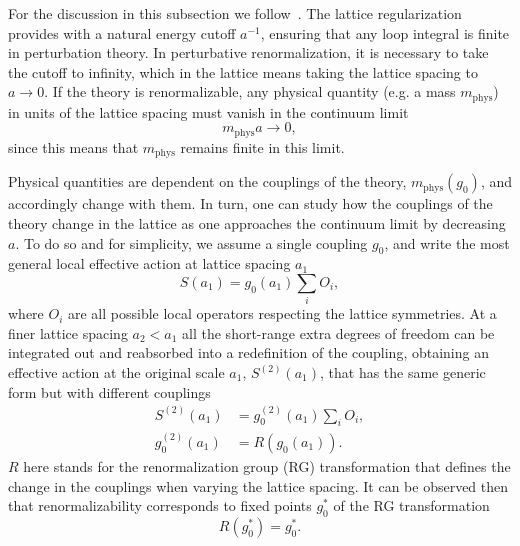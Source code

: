 For the discussion in this subsection we follow~\citep{Hernandez:2009zz}. The lattice regularization provides with a natural energy cutoff $a^{-1}$, ensuring that any loop integral is finite in perturbation theory. In perturbative renormalization, it is necessary to take the cutoff to infinity, which in the lattice means taking the lattice spacing to $a\rightarrow0$. If the theory is renormalizable, any physical quantity (e.g. a mass $m_{\textrm{phys}}$) in units of the lattice spacing must vanish in the continuum limit
\begin{equation}
\label{ch_foundation:eq:ma0}
m_{\textrm{phys}}a\rightarrow0,
\end{equation}
since this means that $m_{\textrm{phys}}$ remains finite in this limit. 

Physical quantities are dependent on the couplings of the theory, $m_{\textrm{phys}}(g_0)$, and accordingly change with them. In turn, one can study how the couplings of the theory change in the lattice as one approaches the continuum limit by decreasing $a$. To do so and for simplicity, we assume a single coupling $g_0$, and write the most general local effective action at lattice spacing $a_1$
\begin{equation}
S(a_1)=g_0(a_1)\sum_i{O}_i,
\end{equation}
where ${O}_i$ are all possible local operators respecting the lattice symmetries. At a finer lattice spacing $a_2<a_1$ all the short-range extra degrees of freedom can be integrated out and reabsorbed into a redefinition of the coupling, obtaining an effective action at the original scale $a_1$, $S^{(2)}(a_1)$, that has the same generic form but with different couplings
\begin{align}
S^{(2)}(a_1)&=g_0^{(2)}(a_1)\sum_iO_i, \\
g_0^{(2)}(a_1)&=R(g_0(a_1)).
\end{align}
$R$ here stands for the renormalization group (RG) transformation that defines the change in the couplings when varying the lattice spacing. It can be observed then that renormalizability corresponds to fixed points $g_0^*$ of the RG transformation
\begin{equation}
R(g_0^*)=g_0^*.
\end{equation}

